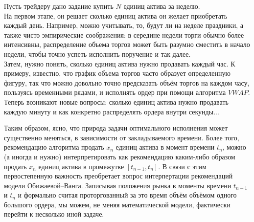 \begin{example}
    Пусть трейдеру дано задание купить $N$ единиц актива за неделю.
    \\ 
    На первом этапе,
    он решает сколько единиц актива он желает приобретать каждый день. Например, можно
    учитывать, то, будут ли на неделе праздники, а также чисто эмпирические соображения:
    в середине недели торги обычно более интенсивны, распределение объема торгов может быть
    разумно сместить в начало недели, чтобы точно успеть исполнить поручение и так далее.
    \\
    Затем, нужно понять, сколько единиц актива нужно продавать каждый час. К примеру, известно,
    что график объема торгов часто образует определенную фигуру, так что можно довольно точно 
    предсказать объём торгов на каждом часу, пользуясь временными рядами, и исполнять ордер при
    помощи алгоритма $VWAP$.
    \\
    Теперь возникают новые вопросы: сколько единиц актива нужно продавать каждую минуту и как конкретно
    распределять ордера внутри секунды... 

\end{example}

Таким образом, ясно, что природа задачи оптимального исполнения может существенно меняться, в зависимости
от закладываемого времени. Более того, рекомендацию алгоритма продать $x_n$ единиц актива в момент времени $t_n$,
можно (а иногда и нужно) интерпретировать как рекомендацию каким-либо образом продать $x_n$ единиц актива 
в промежутке $[t_{n-1}, t_n]$. В связи с этим первостепенную важность преобретает вопрос интерпертации рекомендаций
модели Обижаевой--Ванга. Записывая положения рынка в моменты времени $t_{n-1}$ и $t_n$ и формально считая проторгованный
за это время объём объёмом одного большого ордера, мы можем, не меняя математической модели, фактически перейти к несколько
иной задаче.

